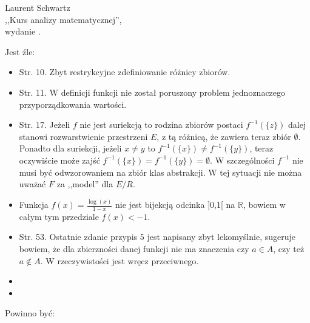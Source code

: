 \documentclass[a4paper,11pt]{article}
\begin{document}
\begin{center}
Laurent Schwartz\\
,,Kurs analizy matematycznej'',\\ wydanie .
\end{center}
Jest źle:
\begin{itemize}
\item Str. 10. Zbyt restrykcyjne zdef\mbox{}iniowanie różnicy zbiorów.
\item Str. 11. W definicji funkcji nie został poruszony problem jednoznaczego przyporządkowania wartości.
\item Str. 17. Jeżeli $f$ nie jest suriekcją to rodzina zbiorów postaci $f^{-1}(\{z\})$ dalej stanowi rozwarstwienie przestrzeni $E$, z tą różnicą, że zawiera teraz zbiór $\emptyset$. Ponadto dla suriekcji, jeżeli $x \neq y$ to $f^{-1}(\{x\})\neq f^{-1}(\{y\})$, teraz oczywiście może zajść $f^{-1}(\{x\})= f^{-1}(\{y\})=\emptyset$. W szczególności $f^{-1}$ nie musi być odwzorowaniem na zbiór klas abstrakcji. W tej sytuacji nie można uważać $F$ za ,,model'' dla $E/R$.
\item Funkcja $f(x)=\frac{\log(x)}{1-x}$ nie jest bijekcją odcinka ]0,1[ na $\mathbb{R}$, bowiem w całym tym przedziale $f(x)<-1$.
\item Str. 53. Ostatnie zdanie przypis 5 jest napisany zbyt lekomyślnie, sugeruje bowiem, że dla zbierzności danej funkcji nie ma znaczenia czy $a\in A$, czy też $a\notin A$. W rzeczywistości jest wręcz przeciwnego.
\item
\item
\end{itemize}
Powinno być:
\end{document}
